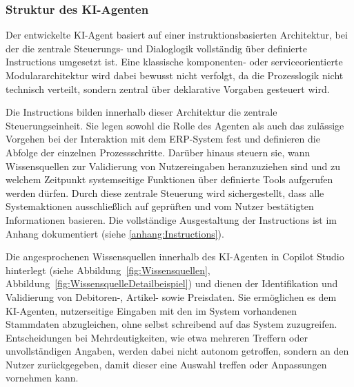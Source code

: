 \subsubsection{Struktur des KI-Agenten}
Der entwickelte \ac{KI}-Agent basiert auf einer instruktionsbasierten Architektur, bei der die zentrale Steuerungs- und Dialoglogik vollständig über definierte Instructions umgesetzt ist. Eine klassische komponenten- oder serviceorientierte Modulararchitektur wird dabei bewusst nicht verfolgt, da die Prozesslogik nicht technisch verteilt, sondern zentral über deklarative Vorgaben gesteuert wird.

Die Instructions bilden innerhalb dieser Architektur die zentrale Steuerungseinheit. Sie legen sowohl die Rolle des Agenten als auch das zulässige Vorgehen bei der Interaktion mit dem \ac{ERP}-System fest und definieren die Abfolge der einzelnen Prozessschritte. Darüber hinaus steuern sie, wann Wissensquellen zur Validierung von Nutzereingaben heranzuziehen sind und zu welchem Zeitpunkt systemseitige Funktionen über definierte Tools aufgerufen werden dürfen. Durch diese zentrale Steuerung wird sichergestellt, dass alle Systemaktionen ausschließlich auf geprüften und vom Nutzer bestätigten Informationen basieren. Die vollständige Ausgestaltung der Instructions ist im Anhang dokumentiert (siehe \ref{anhang:Instructions}).

Die angesprochenen Wissensquellen innerhalb des \ac{KI}-Agenten in Copilot Studio hinterlegt (siehe Abbildung~\ref{fig:Wissensquellen}, Abbildung~\ref{fig:WissensquelleDetailbeispiel}) und dienen der Identifikation und Validierung von Debitoren-, Artikel- sowie Preisdaten. Sie ermöglichen es dem \ac{KI}-Agenten, nutzerseitige Eingaben mit den im System vorhandenen Stammdaten abzugleichen, ohne selbst schreibend auf das System zuzugreifen. Entscheidungen bei Mehrdeutigkeiten, wie etwa mehreren Treffern oder unvollständigen Angaben, werden dabei nicht autonom getroffen, sondern an den Nutzer zurückgegeben, damit dieser eine Auswahl treffen oder Anpassungen vornehmen kann.

